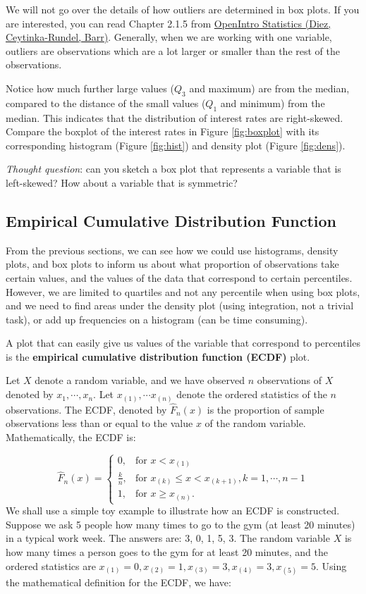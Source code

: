 \documentclass[
]{book}
\begin{document}
We will not go over the details of how outliers are determined in box plots. If you are interested, you can read Chapter 2.1.5 from \href{https://www.openintro.org/book/os/}{OpenIntro Statistics (Diez, Ceytinka-Rundel, Barr)}. Generally, when we are working with one variable, outliers are observations which are a lot larger or smaller than the rest of the observations.

Notice how much further large values (\(Q_3\) and maximum) are from the median, compared to the distance of the small values (\(Q_1\) and minimum) from the median. This indicates that the distribution of interest rates are right-skewed. Compare the boxplot of the interest rates in Figure \ref{fig:boxplot} with its corresponding histogram (Figure \ref{fig:hist}) and density plot (Figure \ref{fig:dens}).

\emph{Thought question}: can you sketch a box plot that represents a variable that is left-skewed? How about a variable that is symmetric?

\subsection{Empirical Cumulative Distribution Function}\label{ecdf}

From the previous sections, we can see how we could use histograms, density plots, and box plots to inform us about what proportion of observations take certain values, and the values of the data that correspond to certain percentiles. However, we are limited to quartiles and not any percentile when using box plots, and we need to find areas under the density plot (using integration, not a trivial task), or add up frequencies on a histogram (can be time consuming).

A plot that can easily give us values of the variable that correspond to percentiles is the \textbf{empirical cumulative distribution function (ECDF)} plot.

Let \(X\) denote a random variable, and we have observed \(n\) observations of \(X\) denoted by \(x_1, \cdots, x_n\). Let \(x_{(1)}, \cdots x_{(n)}\) denote the ordered statistics of the \(n\) observations. The ECDF, denoted by \(\hat{F}_n(x)\) is the proportion of sample observations less than or equal to the value \(x\) of the random variable. Mathematically, the ECDF is:

\[
 \hat{F}_n(x) = 
  \begin{cases} 
   0, & \text{for } x < x_{(1)} \\
   \frac{k}{n},       & \text{for } x_{(k)} \leq x < x_{(k+1)}, k = 1, \cdots, n-1\\
   1, & \text{for } x \geq x_{(n)}.
  \end{cases}
\]
We shall use a simple toy example to illustrate how an ECDF is constructed. Suppose we ask 5 people how many times to go to the gym (at least 20 minutes) in a typical work week. The answers are: 3, 0, 1, 5, 3. The random variable \(X\) is how many times a person goes to the gym for at least 20 minutes, and the ordered statistics are \(x_{(1)} = 0, x_{(2)} = 1, x_{(3)} = 3, x_{(4)} = 3, x_{(5)} = 5\). Using the mathematical definition for the ECDF, we have:
\end{document}
